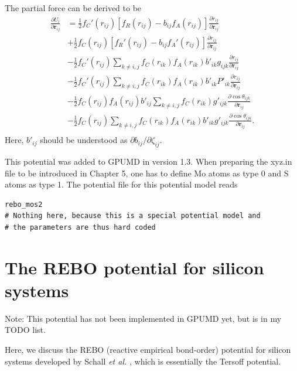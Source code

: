 \documentclass[12pt,a4paper]{report}
\newcommand{\vect}[1]{\boldsymbol{#1}}
\begin{document}
The partial force can be derived to be
\begin{align}
\frac{\partial U_i}{\partial \vect{r}_{ij}}
&= \frac{1}{2}f_C'(r_{ij})[f_R(r_{ij})-b_{ij}f_A(r_{ij})]\frac{\partial r_{ij}}{\partial \vect{r}_{ij}} \nonumber \\
&+ \frac{1}{2}f_C(r_{ij})[f_R'(r_{ij})-b_{ij}f_A'(r_{ij})]\frac{\partial r_{ij}}{\partial \vect{r}_{ij}} \nonumber \\
&- \frac{1}{2}f_C'(r_{ij})\sum_{k\neq i,j}f_C(r_{ik})f_A(r_{ik})b'_{ik}g_{ijk} \frac{\partial r_{ij}}{\partial \vect{r}_{ij}} \nonumber \\
&- \frac{1}{2}f_C'(r_{ij})\sum_{k\neq i,j}f_C(r_{ik})f_A(r_{ik})b'_{ik}P'_{ik} \frac{\partial r_{ij}}{\partial \vect{r}_{ij}} \nonumber \\
&- \frac{1}{2}f_C(r_{ij})f_A(r_{ij})b'_{ij}\sum_{k\neq i,j}f_C(r_{ik})  g'_{ijk}
   \frac{\partial \cos\theta_{ijk}}{\partial \vect{r}_{ij}} \nonumber \\
&- \frac{1}{2}f_C(r_{ij})\sum_{k\neq i,j}f_C(r_{ik})f_A(r_{ik})b'_{ik}  g'_{ijk}
   \frac{\partial \cos\theta_{ijk}}{\partial \vect{r}_{ij}}. \nonumber \\
\end{align}
Here, $b'_{ij}$ should be understood as $\partial b_{ij}/\partial \zeta_{ij}$.


This potential was added to GPUMD in version 1.3. When preparing the xyz.in file to be introduced in Chapter 5, one has to define Mo atoms as type 0 and S atoms as type 1. The potential file for this potential model reads
\begin{verbatim}
rebo_mos2
# Nothing here, because this is a special potential model and 
# the parameters are thus hard coded
\end{verbatim}



\section{The REBO potential for silicon systems}


Note: This potential has not been implemented in GPUMD yet, but is in my TODO list.

Here, we discuss the REBO (reactive empirical bond-order) potential for silicon systems developed by Schall \textit{et al.} \cite{schall2008prb},  which  is essentially the Tersoff potential. 
\end{document}
